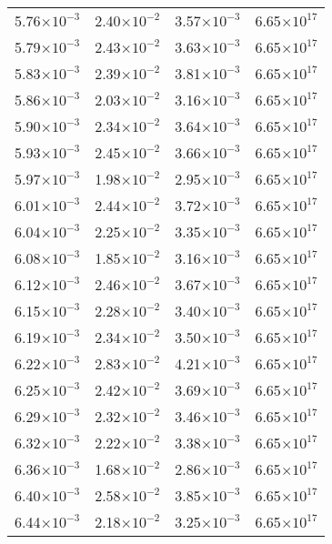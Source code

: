 \documentclass{aa}
\begin{document}
{\begin{longtable}{c|c|c|c}
5.76$\times 10^{-3}$ & 2.40$\times 10^{-2}$ & 3.57$\times 10^{-3}$ & 6.65$\times 10^{17}$  \\
5.79$\times 10^{-3}$ & 2.43$\times 10^{-2}$ & 3.63$\times 10^{-3}$ & 6.65$\times 10^{17}$  \\
5.83$\times 10^{-3}$ & 2.39$\times 10^{-2}$ & 3.81$\times 10^{-3}$ & 6.65$\times 10^{17}$  \\
5.86$\times 10^{-3}$ & 2.03$\times 10^{-2}$ & 3.16$\times 10^{-3}$ & 6.65$\times 10^{17}$  \\
5.90$\times 10^{-3}$ & 2.34$\times 10^{-2}$ & 3.64$\times 10^{-3}$ & 6.65$\times 10^{17}$  \\
5.93$\times 10^{-3}$ & 2.45$\times 10^{-2}$ & 3.66$\times 10^{-3}$ & 6.65$\times 10^{17}$  \\
5.97$\times 10^{-3}$ & 1.98$\times 10^{-2}$ & 2.95$\times 10^{-3}$ & 6.65$\times 10^{17}$  \\
6.01$\times 10^{-3}$ & 2.44$\times 10^{-2}$ & 3.72$\times 10^{-3}$ & 6.65$\times 10^{17}$  \\
6.04$\times 10^{-3}$ & 2.25$\times 10^{-2}$ & 3.35$\times 10^{-3}$ & 6.65$\times 10^{17}$  \\
6.08$\times 10^{-3}$ & 1.85$\times 10^{-2}$ & 3.16$\times 10^{-3}$ & 6.65$\times 10^{17}$  \\
6.12$\times 10^{-3}$ & 2.46$\times 10^{-2}$ & 3.67$\times 10^{-3}$ & 6.65$\times 10^{17}$  \\
6.15$\times 10^{-3}$ & 2.28$\times 10^{-2}$ & 3.40$\times 10^{-3}$ & 6.65$\times 10^{17}$  \\
6.19$\times 10^{-3}$ & 2.34$\times 10^{-2}$ & 3.50$\times 10^{-3}$ & 6.65$\times 10^{17}$  \\
6.22$\times 10^{-3}$ & 2.83$\times 10^{-2}$ & 4.21$\times 10^{-3}$ & 6.65$\times 10^{17}$  \\
6.25$\times 10^{-3}$ & 2.42$\times 10^{-2}$ & 3.69$\times 10^{-3}$ & 6.65$\times 10^{17}$  \\
6.29$\times 10^{-3}$ & 2.32$\times 10^{-2}$ & 3.46$\times 10^{-3}$ & 6.65$\times 10^{17}$  \\
6.32$\times 10^{-3}$ & 2.22$\times 10^{-2}$ & 3.38$\times 10^{-3}$ & 6.65$\times 10^{17}$  \\
6.36$\times 10^{-3}$ & 1.68$\times 10^{-2}$ & 2.86$\times 10^{-3}$ & 6.65$\times 10^{17}$  \\
6.40$\times 10^{-3}$ & 2.58$\times 10^{-2}$ & 3.85$\times 10^{-3}$ & 6.65$\times 10^{17}$  \\
6.44$\times 10^{-3}$ & 2.18$\times 10^{-2}$ & 3.25$\times 10^{-3}$ & 6.65$\times 10^{17}$  \\

\end{longtable}}
\end{document}

